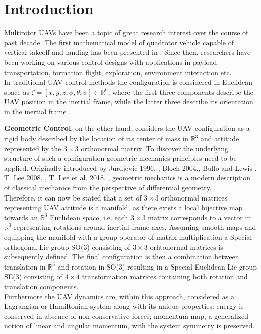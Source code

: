 \section{Introduction}

Multirotor UAVs have been a topic of great research interest over the course of past decade. The first mathematical model of quadrotor vehicle capable of vertical takeoff and landing has been presented in \cite{hamel2002quad}. Since then, researchers have been working on various control designs with applications in payload transportation, formation flight, exploration, environment interaction etc.\\
In traditional UAV control methods the configuration is considered in Euclidean space as $\zeta = [x, y, z, \phi, \theta, \psi] \in \mathbb{R}^6$, where the first three components describe the UAV position in the inertial frame, while the latter three describe its orientation in the inertial frame \cite{uavModel}.

\noindent \textbf{Geometric Control}, on the other hand, considers the UAV configuration as a rigid body described by the location of its center of mass in $\mathbb{R}^3$ and attitude represented by the $3\times3$ orthonormal matrix. To discover the underlying structure of such a configuration geometric mechanics principles need to be applied. Originally introduced by Jurdjevic 1996. \cite{jurdjevic_1996}, Bloch 2004.\cite{bloch}, Bullo and Lewis \cite{bulloBook}, T. Lee 2008. \cite{Lee2008ComputationalGM}, T. Lee et al. 2018. \cite{LeeModel}, geometric mechanics is a modern description of classical mechanics from the perspective of differential geometry. \\
Therefore, it can now be stated that a set of $3\times3$ orthonormal matrices representing UAV attitude is a manifold, as there exists a local bijective map towards an $\mathbb{R}^3$ Euclidean space, i.e. each $3\times3$ matrix corresponds to a vector in $\mathbb{R}^3$ representing rotations around inertial frame axes. Assuming smooth maps and equipping the manifold with a group operator of matrix multiplication a Special orthogonal Lie group SO(3) consisting of $3\times3$ orhtonormal matrices is subsequently defined. The final configuration is then a combination between translation in $\mathbb{R}^3$ and rotation in SO(3) resulting in a Special Euclidean Lie group SE(3) consisting of $4\times4$ transformation matrices containing both rotation and translation components. \\ 
Furthermore the UAV dynamics are, within this approach, considered as a Lagrangian or Hamiltonian system along with its unique properties: energy is conserved in absence of non-conservative forces; momentum map, a generalized notion of linear and angular momentum, with the system symmetry is preserved.

